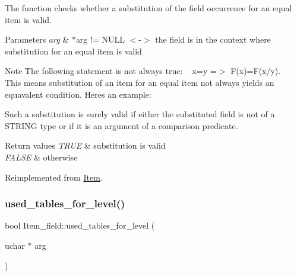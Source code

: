 The function checks whether a substitution of the field occurrence for an equal item is valid.


\begin{DoxyParams}{Parameters}
{\em arg} & $\ast$arg != N\+U\+LL $<$-\/$>$ the field is in the context where substitution for an equal item is valid\\
\hline
\end{DoxyParams}
\begin{DoxyNote}{Note}
The following statement is not always true\+: ~\newline
 x=y =$>$ F(x)=F(x/y). ~\newline
 This means substitution of an item for an equal item not always yields an equavalent condition. Here\textquotesingle{}s an example\+: 
\begin{DoxyCode}{0}
\DoxyCodeLine{\textcolor{charliteral}{'a'}=\textcolor{stringliteral}{'a '}}
\end{DoxyCode}
 Such a substitution is surely valid if either the substituted field is not of a S\+T\+R\+I\+NG type or if it is an argument of a comparison predicate.
\end{DoxyNote}

\begin{DoxyRetVals}{Return values}
{\em T\+R\+UE} & substitution is valid \\
\hline
{\em F\+A\+L\+SE} & otherwise \\
\hline
\end{DoxyRetVals}


Reimplemented from \mbox{\hyperlink{classItem}{Item}}.

\mbox{\label{classItem__field_a29900919e790061d19f828b4baf5fc25}} 
\subsubsection{\texorpdfstring{used\+\_\+tables\+\_\+for\+\_\+level()}{used\_tables\_for\_level()}}
{\footnotesize\ttfamily bool Item\+\_\+field\+::used\+\_\+tables\+\_\+for\+\_\+level (\begin{DoxyParamCaption}\item[{uchar $\ast$}]{arg }\end{DoxyParamCaption})\hspace{0.3cm}{\ttfamily [virtual]}}


